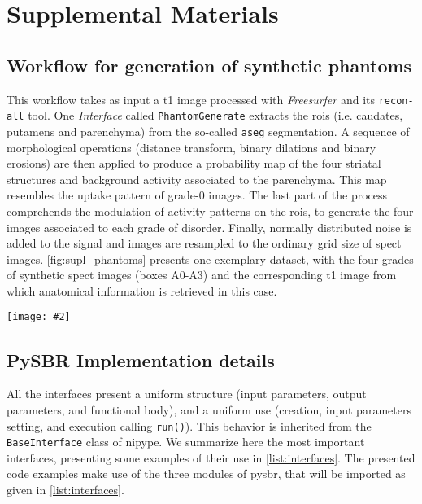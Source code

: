 \documentclass{frontiers}
\newcommand{\insertgraphic}[2]{\texttt{[image: \#2]}}
\newcommand{\insertgraphic}[2]{\texttt{[image: \#2]}}
\begin{document}
\newpage
\appendix
\setcounter{page}{1}
\renewcommand*{\thepage}{Supplemental Material - \arabic{page}}
\renewcommand*{\thesubsection}{S.\arabic{subsection}}

\section*{Supplemental Materials}\label{supl}
\subsection{Workflow for generation of synthetic phantoms}\label{supl:synth_phantom_wf}
This workflow takes as input a \gls*{t1} image processed with \emph{Freesurfer} and its
  \texttt{recon-all} tool.
One \emph{Interface} called \texttt{PhantomGenerate} extracts the \glspl*{roi} 
  (i.e. caudates, putamens and parenchyma) from the so-called \texttt{aseg} segmentation.
A sequence of morphological operations (distance transform, binary dilations and binary
  erosions) are then applied to produce a probability map of the four striatal structures
  and background activity associated to the parenchyma.
This map resembles the uptake pattern of grade-0 images.
The last part of the process comprehends the modulation of activity patterns on the
  \glspl*{roi}, to generate the four images associated to each grade of disorder.
Finally, normally distributed noise is added to the signal and images are resampled
  to the ordinary grid size of \gls*{spect} images.
\autoref{fig:supl_phantoms} presents one exemplary dataset, with the four grades of
  synthetic \gls*{spect} images (boxes A0-A3) and the corresponding \gls*{t1} image
  from which anatomical information is retrieved in this case.

\begin{figure*}[ht]
\centering 
\insertgraphic{width=1.0\linewidth}{figures/07-images-phantoms}
\caption{%
\textbf{Example of one synthetic phantom}. A0-A3 represent the four simulated
  grades of disease, and B is the underlying \gls*{t1} MRI with the 
  overlay of the \glspl*{roi}.\label{fig:supl_phantoms}}
\end{figure*}


\subsection{PySBR Implementation details}
\label{supl:implementation_details}

All the interfaces present a uniform structure (input parameters, output parameters,
  and functional body), and a uniform use (creation, input parameters setting, and
  execution calling \texttt{run()}).
This behavior is inherited from the \texttt{BaseInterface} class of \gls*{nipype}.
We summarize here the most important interfaces,
  presenting some examples of their use in \autoref{list:interfaces}.
The presented code examples make use of the three modules of 
  \gls*{pysbr}, that will be imported as given in \autoref{list:interfaces}.
\end{document}

